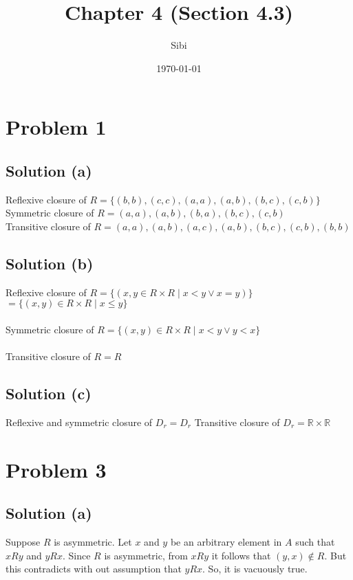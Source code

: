 \documentclass{article}
\begin{document}
\title{Chapter 4 (Section 4.3)}
\author{Sibi}
\date{\today}
\maketitle
\newpage

\section{Problem 1}
\subsection{Solution (a)}

Reflexive closure of $R = \{(b,b), (c,c), (a,a), (a,b), (b,c),
(c,b)\}$ \\
Symmetric closure of $R = (a,a), (a,b), (b,a), (b,c), (c,b)$ \\
Transitive closure of $R = (a,a), (a,b), (a,c), (a,b), (b,c), (c,b),
(b,b)$

\subsection{Solution (b)}

Reflexive closure of $R = \{(x,y \in R \times R \mid x < y \lor x =
y)\}$ \\
$= \{(x,y) \in R \times R \mid x \leq y\}$ \\ \\
Symmetric closure of $R = \{(x,y) \in R \times R \mid x < y \lor y <
x\}$ \\ \\
Transitive closure of $R = R$

\subsection{Solution (c)}

Reflexive and symmetric closure of $D_r = D_r$
Transitive closure of $D_r = \mathbb{R} \times \mathbb{R}$

\section{Problem 3}
\subsection{Solution (a)}

Suppose $R$ is asymmetric. Let $x$ and $y$ be an arbitrary element in
$A$ such that $xRy$ and $yRx$. Since $R$ is asymmetric, from $xRy$ it
follows that $(y,x) \notin R$. But this contradicts with out
assumption that $yRx$. So, it is vacuously true.
\end{document}
